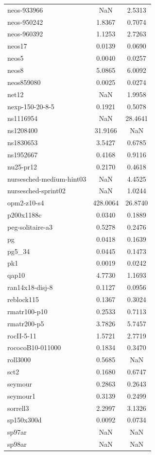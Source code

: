 \begin{longtable}{lcc}
neos-933966 & NaN & 2.5313 \\
neos-950242 & 1.8367 & 0.7074 \\
neos-960392 & 1.1253 & 2.7263 \\
neos17 & 0.0139 & 0.0690 \\
neos5 & 0.0040 & 0.0257 \\
neos8 & 5.0865 & 6.0092 \\
neos859080 & 0.0025 & 0.0274 \\
net12 & NaN & 1.9958 \\
nexp-150-20-8-5 & 0.1921 & 0.5078 \\
ns1116954 & NaN & 28.4641 \\
ns1208400 & 31.9166 & NaN \\
ns1830653 & 3.5427 & 0.6785 \\
ns1952667 & 0.4168 & 0.9116 \\
nu25-pr12 & 0.2170 & 0.4618 \\
nursesched-medium-hint03 & NaN & 4.4525 \\
nursesched-sprint02 & NaN & 1.0244 \\
opm2-z10-s4 & 428.0064 & 26.8740 \\
p200x1188c & 0.0340 & 0.1889 \\
peg-solitaire-a3 & 0.5278 & 0.2476 \\
pg & 0.0418 & 0.1639 \\
pg5_34 & 0.0445 & 0.1473 \\
pk1 & 0.0019 & 0.0242 \\
qap10 & 4.7730 & 1.1693 \\
ran14x18-disj-8 & 0.1127 & 0.0956 \\
reblock115 & 0.1367 & 0.3024 \\
rmatr100-p10 & 0.2533 & 0.7113 \\
rmatr200-p5 & 3.7826 & 5.7457 \\
rocII-5-11 & 1.5721 & 2.7719 \\
rococoB10-011000 & 0.1834 & 0.3470 \\
roll3000 & 0.5685 & NaN \\
sct2 & 0.1680 & 0.6747 \\
seymour & 0.2863 & 0.2643 \\
seymour1 & 0.3139 & 0.2499 \\
sorrell3 & 2.2997 & 3.1326 \\
sp150x300d & 0.0092 & 0.0734 \\
sp97ar & NaN & NaN \\
sp98ar & NaN & NaN \\

\end{longtable}
